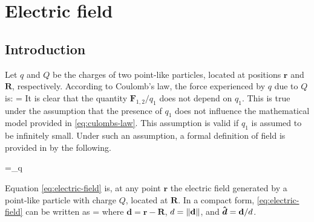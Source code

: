 \chapter{Electric field}
\section{Introduction}
Let $q$ and $Q$ be the charges of two point-like particles, located at positions $\mathbf{r}$ and $\mathbf{R}$, respectively.
According to Coulomb's law, the force experienced by $q$ due to $Q$ is:
\be\label{eq:culombs-law}
=
\ee
It is clear that the quantity $\mathbf{F}_{1,2}/q_{1}$ does not depend on $q_{1}$. This is true under the assumption that the presence of $q_{1}$ does not influence the mathematical model provided in \ref{eq:culombs-law}. This assumption is valid if $q_{1}$ is assumed to be infinitely small. Under such an assumption, a formal definition of field is provided in by the following.

\be\label{eq:electric-field}
=\lim_{q } 
\ee

Equation \ref{eq:electric-field} is, at any point $\mathbf{r}$ the electric field generated by a point-like particle with charge $Q$, located at $\mathbf{R}$.
In a compact form, \ref{eq:electric-field} can be written as 
\be
{}=
\ee
where $\mathbf{d}=\mathbf{\mathbf{r}-\mathbf{R}}$, $d=\left\lVert\mathbf{d}\right\rVert$, and $\boldsymbol{\hat{\textbf{$d$}}}=\mathbf{d}/d$.